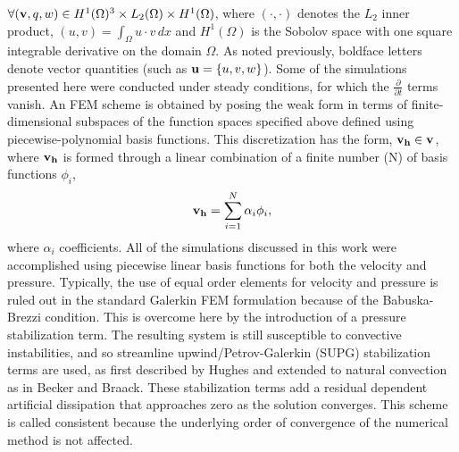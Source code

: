 $\forall ({\bf v},q,w) \in H^1(\Omega)^3 \times L_2(\Omega) \times
H^1(\Omega)$, where $(\cdot,\cdot)$ denotes the $L_2$ inner product, 
$(u,v) = \int_\Omega u \cdot v \, dx$ and $H^1(\Omega)$ is the
Sobolov space with one square integrable derivative on the domain
$\Omega$\cite{oden2012introduction}. As noted previously, boldface letters
denote vector quantities (such as ${\bf u} = \left \{ u,v,w \right \}$). 
Some of the simulations presented here were conducted under
steady conditions, for which the $\frac{\partial}{\partial t}$ terms
vanish. An FEM scheme is obtained by posing the weak form in
terms of finite-dimensional subspaces of the function spaces specified above
defined using piecewise-polynomial basis functions. This discretization
has the form, $ {\bf v_h} \in {\bf v}$, where ${\bf v_h}$ is 
formed through a linear combination of a finite number (N) of basis
functions $\phi_i$,  
\begin{equation}
 {\bf v_h} = \sum_{i=1}^N \alpha_i \phi_i,
\end{equation}
where $\alpha_i$ coefficients.
%
%
All of the simulations discussed in this work were 
accomplished using piecewise linear basis functions for both the
velocity and pressure. Typically, the use of equal order elements for
velocity and pressure is ruled out in the standard Galerkin FEM
formulation because of the Babuska-Brezzi condition\cite{bb-cond}. 
This is overcome here by 
the introduction of a pressure stabilization
term\cite{becker1981introduction}. The resulting system is still
susceptible to convective instabilities, and so streamline upwind/Petrov-Galerkin
(SUPG) stabilization terms are used, as first described by
Hughes\cite{Hughes198685,supg} and extended to natural convection as in
Becker and Braack\cite{Becker2002428}. These stabilization terms add a
residual dependent artificial dissipation that approaches zero as the
solution converges. This scheme is called consistent because the
underlying order of convergence of the numerical method is not
affected\cite{hughes2000finite}.    

